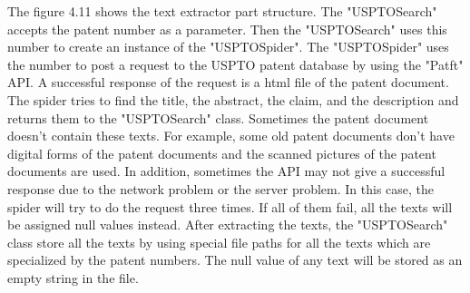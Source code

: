 The figure 4.11 shows the text extractor part structure. The "USPTOSearch"  accepts the patent number as a parameter. Then the "USPTOSearch" uses this number to create an instance of the "USPTOSpider". The "USPTOSpider" uses the number to post a request to the USPTO patent database by using the "Patft" API. A successful response of the request is a html file of the patent document. The spider tries to find the title, the abstract, the claim, and the description and returns them to the "USPTOSearch" class. Sometimes the patent document doesn't contain these texts. For example, some old patent documents don't have digital forms of the patent documents and the scanned pictures of the patent documents are used. In addition, sometimes the API may not give a successful response due to the network problem or the server problem. In this case, the spider will try to do the request three times. If all of them fail, all the texts will be assigned  null values instead. After extracting the texts, the "USPTOSearch" class store all the texts by using special file paths for all the texts which are specialized by the patent numbers. The null value of any text will be stored as an empty string in the file. 


